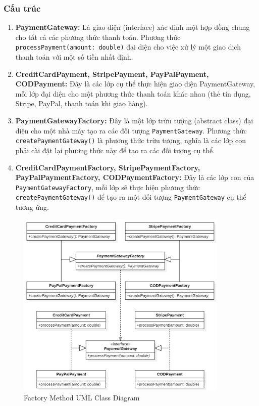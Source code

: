 \subsubsection{Cấu trúc}
\begin{flushleft}
    \begin{enumerate}
        \item \textbf{PaymentGateway:} Là giao diện (interface) xác định một hợp đồng chung cho tất cả các phương thức thanh toán. Phương thức \verb|processPayment(amount: double)| đại diện cho việc xử lý một giao dịch thanh toán với một số tiền nhất định.
        \item \textbf{CreditCardPayment, StripePayment, PayPalPayment, CODPayment:} Đây là các lớp cụ thể thực hiện giao diện PaymentGateway, mỗi lớp đại diện cho một phương thức thanh toán khác nhau (thẻ tín dụng, Stripe, PayPal, thanh toán khi giao hàng).
        \item \textbf{PaymentGatewayFactory:} Đây là một lớp trừu tượng (abstract class) đại diện cho một nhà máy tạo ra các đối tượng \verb|PaymentGateway|. Phương thức \verb|createPaymentGateway()| là phương thức trừu tượng, nghĩa là các lớp con phải cài đặt lại phương thức này để tạo ra các đối tượng cụ thể.
        \item \textbf{CreditCardPaymentFactory, StripePaymentFactory, PayPalPaymentFactory, CODPaymentFactory:} Đây là các lớp con của \verb|PaymentGatewayFactory|, mỗi lớp sẽ thực hiện phương thức \verb|createPaymentGateway()| để tạo ra một đối tượng \verb|PaymentGateway| cụ thể tương ứng.
    \end{enumerate}

    \begin{figure}[H]
        \centering
        \includegraphics[width=0.9\textwidth]{../assets/screenshots/uml/factory_method.png}
        \caption{Factory Method UML Class Diagram}
    \end{figure}
\end{flushleft}

